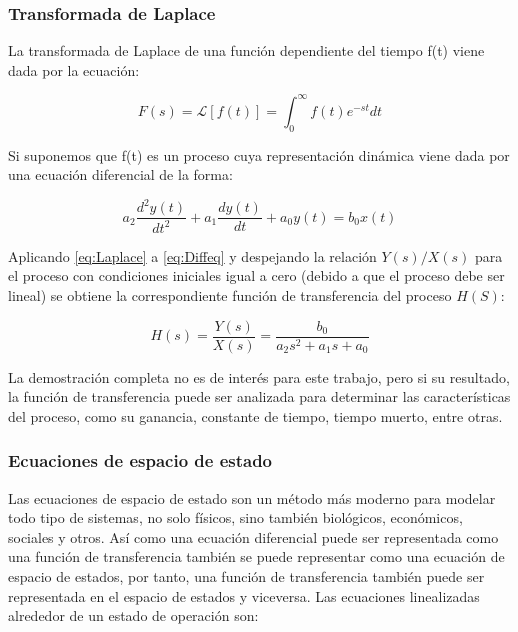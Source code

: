 		\subsubsection{Transformada de Laplace}
		
			La transformada de Laplace de una función dependiente del tiempo f(t) viene dada por la ecuación:
			
			\begin{equation}\label{eq:Laplace}
				F(s) = \mathcal{L}\left[f(t) \right] = \int_{0}^{\infty} f(t)e^{-st}dt
			\end{equation}
			
			Si suponemos que f(t) es un proceso cuya representación dinámica viene dada por una ecuación diferencial de la forma:
			
			\begin{equation}\label{eq:Diffeq}
				a_{2}\frac{d^{2}y(t)}{dt^{2}} + a_{1}\frac{dy(t)}{dt} + a_{0}y(t) = b_{0}x(t)
			\end{equation}
			
			Aplicando \cref{eq:Laplace} a \cref{eq:Diffeq}  y despejando la relación $Y(s)/X(s)$ para el proceso con condiciones iniciales igual a cero (debido a que el proceso debe ser lineal) se obtiene la correspondiente función de transferencia del proceso $H(S)$:
			
			 \begin{equation}\label{eq:TransferFunction}
			 	H(s) =	\frac{Y(s)}{X(s)} = \frac{b_{0}}{a_{2}s^{2} + a_{1}s + a_{0}}
			 \end{equation}
			 
			 La demostración completa \Parencite[pp.$\,$21-22]{smith1985principles} no es de interés para este trabajo, pero si su resultado, la función de transferencia puede ser analizada para determinar las características del proceso, como su ganancia, constante de tiempo, tiempo muerto, entre otras.
			 
		 \subsubsection{Ecuaciones de espacio de estado}
		 
		 	Las ecuaciones de espacio de estado son un método más moderno para modelar todo tipo de sistemas, no solo físicos, sino también biológicos, económicos, sociales y otros. Así como una ecuación diferencial puede ser representada como una función de transferencia también se puede representar como una ecuación de espacio de estados, por tanto, una función de transferencia también puede ser representada en el espacio de estados y viceversa. Las ecuaciones linealizadas alrededor de un estado de operación \Parencite[p.$\,$31]{ogata2003ingenieria} son:
		 
